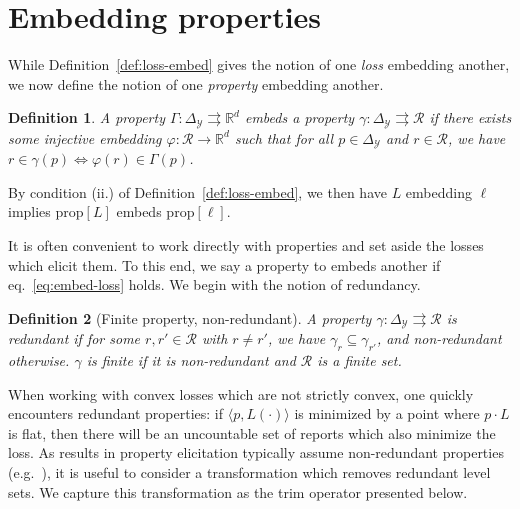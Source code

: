 \documentclass[12pt]{article}
\newcommand{\reals}{\mathbb{R}}
\newcommand{\prop}[1]{\mathrm{prop}[#1]}
\newcommand{\simplex}{\Delta_\Y}
\newcommand{\R}{\mathcal{R}}
\newcommand{\Y}{\mathcal{Y}}
\newcommand{\inprod}[2]{\langle #1, #2 \rangle}%
\newcommand{\toto}{\rightrightarrows}
\newtheorem{definition}{Definition}
\begin{document}
\section{Embedding properties}\label{app:embed-props}

While Definition~\ref{def:loss-embed} gives the notion of one \emph{loss} embedding another, we now define the notion of one \emph{property} embedding another.
\begin{definition}\label{def:prop-embed}
	A property $\Gamma : \simplex \toto \reals^d$ embeds a property $\gamma:\simplex \toto \R$ if there exists some injective embedding $\varphi:\R \to \reals^d$ such that for all $p \in \simplex$ and $r \in \R$, we have $r \in \gamma(p) \iff \varphi(r) \in \Gamma(p)$.
\end{definition}

By condition (ii.) of Definition~\ref{def:loss-embed}, we then have $L$ embedding $\ell$ implies $\prop{L}$ embeds $\prop{\ell}$.


It is often convenient to work directly with properties and set aside the losses which elicit them.
To this end, we say a property to embeds another if eq.~\eqref{eq:embed-loss} holds.
We begin with the notion of redundancy.
\begin{definition}[Finite property, non-redundant]
  A property $\gamma:\simplex\toto\R$ is \emph{redundant} if for some $r,r'\in\R$ with $r \neq r'$, we have $\gamma_r \subseteq \gamma_{r'}$, and \emph{non-redundant} otherwise.
  $\gamma$ is \emph{finite} if it is non-redundant and $\R$ is a finite set.
\end{definition}


When working with convex losses which are not strictly convex, one quickly encounters redundant properties: if $\inprod{p}{L(\cdot)}$ is minimized by a point where $p\cdot L$ is flat, then there will be an uncountable set of reports which also minimize the loss.
As results in property elicitation typically assume non-redundant properties (e.g.~\cite{frongillo2014general,frongillo2015elicitation}), it is useful to consider a transformation which removes redundant level sets.
We capture this transformation as the trim operator presented below.
\end{document}
